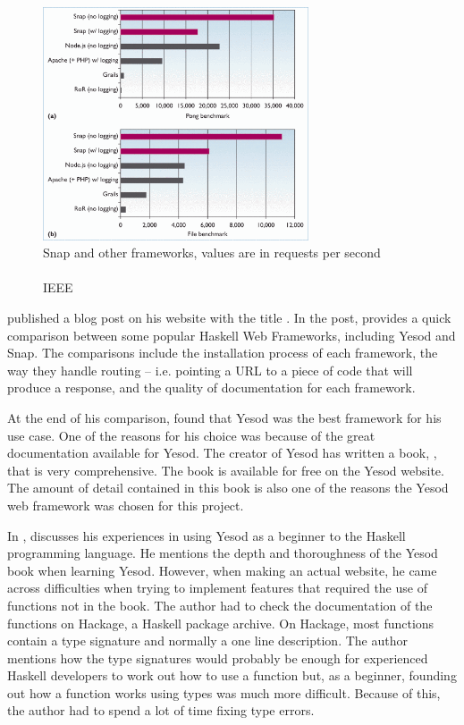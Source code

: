 \begin{figure}[H]
	\centering
	\includegraphics[width=0.7\textwidth]{final_report/pics/snapBenchmark.png}
	\captionsetup{justification=centering}
	\caption{Snap and other frameworks, values are in requests per second \\
	\parencite{snapFramework} \\
	\textcopyright{} \citeyear{snapFramework} IEEE} 
	\label{fig:snapBenchmark}
\end{figure}

\citeauthor{haskellWebComparison} published a blog post on his website with the
title . In the post, \citeauthor{haskellWebComparison}
provides a quick comparison between some popular Haskell Web Frameworks, including
Yesod and Snap. The comparisons include the installation process of each framework,
the way they handle routing -- i.e. pointing a URL to a piece of code that will 
produce a response, and the quality of documentation for each framework. \parencite{haskellWebComparison}

At the end of his comparison, \citeauthor{haskellWebComparison} found that Yesod
was the best framework for his use case. One of the reasons for his choice was
because of the great documentation available for Yesod. The creator of Yesod
has written a book, , that is very comprehensive. The book
is available for free on the Yesod website. The amount of detail contained in this
book is also one of the reasons the Yesod web framework was chosen for this
project. \parencite{haskellWebComparison,yesodBook}

In , \citeauthor{beginnerYesod} discusses his experiences
in using Yesod as a beginner to the Haskell programming language. He mentions
the depth and thoroughness of the Yesod book when learning Yesod. However, when
making an actual website, he came across difficulties when trying to implement
features that required the use of functions not in the book. The author had
to check the documentation of the functions on Hackage, a Haskell package archive.
On Hackage, most functions contain a type signature and normally a one line
description. The author mentions how the type signatures would probably be
enough for experienced Haskell developers to work out how to use a function
but, as a beginner, founding out how a function works using types was much more
difficult. Because of this, the author had to spend a lot of time fixing type
errors. \parencite{beginnerYesod}

